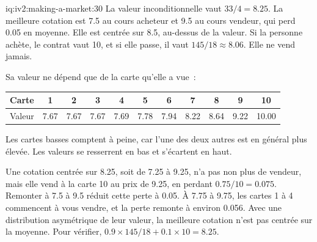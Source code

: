 \begin{solution}{iq:iv2:making-a-market:30}
La valeur inconditionnelle vaut $33/4 = 8.25$. La meilleure cotation est 7.5 au cours acheteur et 9.5 au cours vendeur, qui perd 0.05 en moyenne. Elle est centrée sur 8.5, au-dessus de la valeur. Si la personne achète, le contrat vaut 10, et si elle passe, il vaut $145/18 \approx 8.06$. Elle ne vend jamais.

Sa valeur ne dépend que de la carte qu'elle a vue~:
\begin{center}\small
\begin{tabular}{@{}l*{10}{c}@{}}
Carte & 1 & 2 & 3 & 4 & 5 & 6 & 7 & 8 & 9 & 10 \\ \hline
Valeur & 7.67 & 7.67 & 7.67 & 7.69 & 7.78 & 7.94 & 8.22 & 8.64 & 9.22 & 10.00
\end{tabular}
\end{center}
Les cartes basses comptent à peine, car l'une des deux autres est en général plus élevée. Les valeurs se resserrent en bas et s'écartent en haut.

Une cotation centrée sur 8.25, soit de 7.25 à 9.25, n'a pas non plus de vendeur, mais elle vend à la carte 10 au prix de 9.25, en perdant $0.75/10 = 0.075$. Remonter à 7.5 à 9.5 réduit cette perte à 0.05. À 7.75 à 9.75, les cartes 1 à 4 commencent à vous vendre, et la perte remonte à environ 0.056. Avec une distribution asymétrique de leur valeur, la meilleure cotation n'est pas centrée sur la moyenne. Pour vérifier, $0.9 \times 145/18 + 0.1 \times 10 = 8.25$.

\end{solution}


